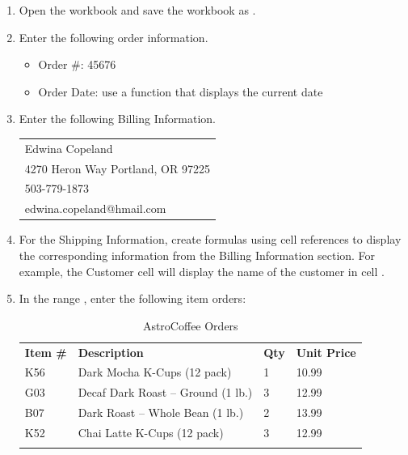 \begin{enumerate}
	\item Open the  workbook and save the workbook as .
\item Enter the following order information.
\begin{itemize}
	\item Order \#: 45676
	\item Order Date: use a function that displays the current date
\end{itemize}

\item Enter the following Billing Information.

\begin{tabular}{l}
	\hline
	Edwina Copeland\\
	4270 Heron Way Portland, OR 97225\\
	503-779-1873\\
	edwina.copeland@hmail.com\\
	\hline
\end{tabular}

\item For the Shipping Information, create formulas using cell references to display the corresponding information from the Billing Information section. For example, the Customer cell will display the name of the customer in cell .
\item In the range , enter the following item orders:

{\small
	\begin{longtable}{p{0.4in}p{2.10in}p{0.25in}p{0.5in}} %
		\textbf{Item \#} & \textbf{Description} & \textbf{Qty} & \textbf{Unit Price}\endhead
		\hline \\
		K56 & Dark Mocha K-Cups (12 pack) & 1 & 10.99\\
		G03 & Decaf Dark Roast – Ground (1 lb.) & 3 & 12.99\\
		B07 & Dark Roast – Whole Bean (1 lb.) & 2 & 13.99\\
		K52 & Chai Latte K-Cups (12 pack) & 3 & 12.99\\
		\caption{AstroCoffee Orders}
		\label{03:tab02}
	\end{longtable}
}


\end{enumerate}

